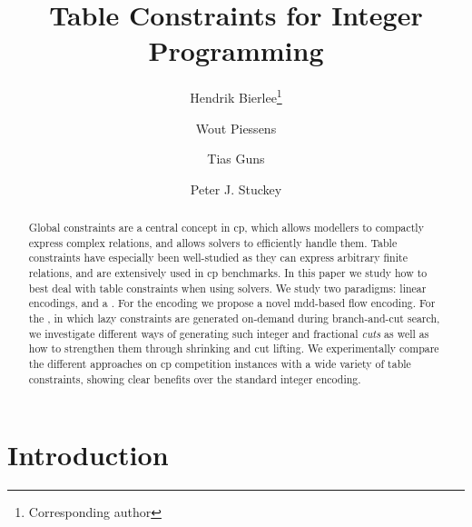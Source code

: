 \documentclass[a4paper,UKenglish,cleveref,autoref,thm-restate]{lipics-v2021}
\title{Table Constraints for Integer Programming}
\author{Hendrik Bierlee\footnote{Corresponding author}}{KU Leuven, Belgium}{henk.bierlee@kuleuven.be}{https://orcid.org/0000-0001-6766-5435}{}
\author{Wout Piessens}{KU Leuven, Belgium}{wout.piessens@kuleuven.be}{https://orcid.org/0009-0005-5608-2097}{}
\author{Tias Guns}{KU Leuven, Belgium}{tias.guns@kuleuven.be}{https://orcid.org/0000-0002-2156-2155}{}
\author{Peter J. Stuckey}{Monash University, Melbourne, Australia \and OPTIMA ITTC, Melbourne, Australia}{peter.stuckey@monash.edu}{https://orcid.org/0000-0003-2186-0459}{}
\begin{document}
\maketitle

\begin{abstract}
Global constraints are a central concept in \gls{cp}, which allows modellers to compactly express complex relations, and allows solvers to efficiently handle them.
Table constraints have especially been well-studied as they can express arbitrary finite relations, and are extensively used in \gls{cp} benchmarks.
In this paper we study how to best deal with table constraints when using \milp solvers.
We study two paradigms: linear encodings, and a .
For the encoding we propose a novel 
\acrshort{mdd}-based flow encoding.
For the , in which lazy constraints are generated on-demand during branch-and-cut search, we investigate different ways of generating such integer and fractional \textit{cuts} as well as how to strengthen them through shrinking and cut lifting.
We experimentally compare the different approaches on \gls{cp} competition instances with a wide variety of table constraints, showing clear benefits over the standard integer encoding.

\end{abstract}

\glsresetall




\section{Introduction}
\label{sec:intro}
\end{document}
